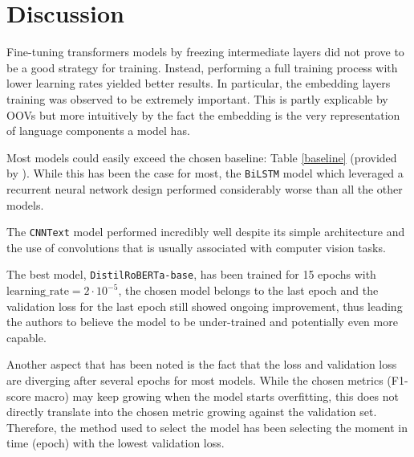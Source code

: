 \documentclass[11pt]{article}
\begin{document}


\section{Discussion}
\label{sec:discussion}

Fine-tuning transformers models by freezing intermediate layers did not prove to be a good strategy for training. Instead, performing a full training process with lower learning rates yielded better results. In particular, the embedding layers training was observed to be extremely important. This is partly explicable by OOVs but more intuitively by the fact the embedding is the very representation of language components a model has.

Most models could easily exceed the chosen baseline: Table \ref{baseline} (provided by \cite{Kiesel2022}). While this has been the case for most, the \texttt{BiLSTM} model which leveraged a recurrent neural network design performed considerably worse than all the other models.

The \texttt{CNNText} model performed incredibly well despite its simple architecture and the use of convolutions that is usually associated with computer vision tasks.

The best model, \texttt{DistilRoBERTa-base}, has been trained for 15 epochs with $\text{learning\_rate}=2 \cdot 10^{-5}$, the chosen model belongs to the last epoch and the validation loss for the last epoch still showed ongoing improvement, thus leading the authors to believe the model to be under-trained and potentially even more capable.

Another aspect that has been noted is the fact that the loss and validation loss are diverging after several epochs for most models. While the chosen metrics (F1-score macro) may keep growing when the model starts overfitting, this does not directly translate into the chosen metric growing against the validation set. Therefore, the method used to select the model has been selecting the moment in time (epoch) with the lowest validation loss.
\end{document}
